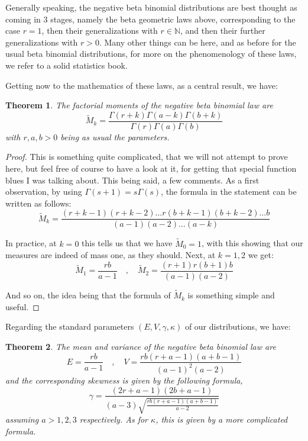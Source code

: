 \documentclass[12pt]{amsbook}
\newtheorem{theorem}{Theorem}[chapter]
\begin{document}
Generally speaking, the negative beta binomial distributions are best thought as coming in 3 stages, namely the beta geometric laws above, corresponding to the case $r=1$, then their generalizations with $r\in\mathbb N$, and then their further generalizations with $r>0$. Many other things can be here, and as before for the usual beta binomial distributions, for more on the phenomenology of these laws, we refer to a solid statistics book.

\bigskip

Getting now to the mathematics of these laws, as a central result, we have:

\begin{theorem}
The factorial moments of the negative beta binomial law are
$$\widetilde{M}_k=\frac{\Gamma(r+k)\Gamma(a-k)\Gamma(b+k)}{\Gamma(r)\Gamma(a)\Gamma(b)}$$
with $r,a,b>0$ being as usual the parameters.
\end{theorem}

\begin{proof}
This is something quite complicated, that we will not attempt to prove here, but feel free of course to have a look at it, for getting that special function blues I was talking about. This being said, a few comments. As a first observation, by using $\Gamma(s+1)=s\Gamma(s)$, the formula in the statement can be written as follows:
$$\widetilde{M}_k=\frac{(r+k-1)(r+k-2)\ldots r(b+k-1)(b+k-2)\ldots b}{(a-1)(a-2)\ldots(a-k)}$$

In practice, at $k=0$ this tells us that we have $\widetilde{M}_0=1$, with this showing that our measures are indeed of mass one, as they should. Next, at $k=1,2$ we get:
$$\widetilde{M}_1=\frac{rb}{a-1}\quad,\quad \widetilde{M}_2=\frac{(r+1)r(b+1)b}{(a-1)(a-2)}$$

And so on, the idea being that the formula of $\widetilde{M}_k$ is something simple and useful.
\end{proof}

Regarding the standard parameters $(E,V,\gamma,\kappa)$ of our distributions, we have:

\begin{theorem}
The mean and variance of the negative beta binomial law are
$$E=\frac{rb}{a-1}\quad,\quad V=\frac{rb(r+a-1)(a+b-1)}{(a-1)^2(a-2)}$$
and the corresponding skewness is given by the following formula,
$$\gamma=\frac{(2r+a-1)(2b+a-1)}{(a-3)\sqrt{\frac{rb(r+a-1)(a+b-1)}{a-2}}}$$
assuming $a>1,2,3$ respectively. As for $\kappa$, this is given by a more complicated formula.
\end{theorem}
\end{document}
